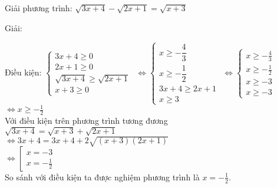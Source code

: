 
         
      
          \begin{vd}
              Giải phương trình: $\sqrt{3x+4} - \sqrt{2x+1} = \sqrt{x+3}$
          \end{vd}
          \begin{center}

            Giải:
         \end{center}
         Điều kiện: $ \begin{cases}
                            3x + 4 \geq 0 \\
                            2x + 1 \geq 0 \\
                            \sqrt{3x+4} \geq \sqrt{2x+1}\\
                            x+3 \geq 0
                      \end{cases}
                    $
                    $\Leftrightarrow
                    \begin{cases}
                        x \geq - \dfrac{4}{3} \\
                        x \geq -\dfrac{1}{2} \\
                        3x +4 \geq 2x +1 \\
                        x \geq 3
                    \end{cases}
                    $
                    $\Leftrightarrow
                    \begin{cases}
                        x \geq -\frac{4}{3} \\
                        x \geq -\frac{1}{2} \\
                        x \geq -3 \\
                        x \geq -3
                    \end{cases}
                    $
                    $\Leftrightarrow x \geq -\frac{1}{2}$ \\
                    Với điều kiện trên phương trình tương đương \\
                    $
                    \sqrt{3x+4} = \sqrt{x+3} + \sqrt{2x+1}
                    $ \\
                    $\Leftrightarrow
                    3x+4 = 3x +4 + 2\sqrt{(x+3)(2x+1)}
                    $ \\
                    $\Leftrightarrow 
                    \left[
                        \begin{array}{l}
                            x=-3 \\
                            x=-\frac{1}{2}
                        \end{array}
                    \right.
                    $ \\
                    So sánh với điều kiện ta được nghiệm phương trình là $x=-\frac{1}{2}$.


